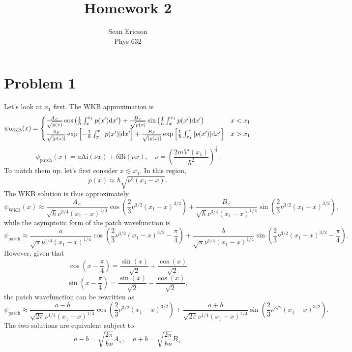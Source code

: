 \documentclass[12pt]{article}
\newcommand{\cint}[2]{\int_{#1}^{#2}}
\begin{document}
	
\title{Homework 2}
\author{Sean Ericson \\ Phys 632}
\maketitle

\section*{Problem 1}
Let's look at $x_1$ first. The WKB approximation is
\[ \psi_\text{WKB}(x) = \begin{cases}
    \frac{A_<}{\sqrt{p(x)}}\cos\left(\frac{1}{\hbar}\cint{x}{x_1}p(x')\dd x'\right) + \frac{B_<}{\sqrt{p(x)}}\sin\left(\frac{1}{\hbar}\cint{x}{x_1}p(x')\dd x'\right) & x < x_1 \\
    \frac{A_F}{\sqrt{\abs{p(x)}}}\exp\left[-\frac{1}{\hbar}\cint{x_1}{x}\abs{p(x')}\dd x'\right] + \frac{B_F}{\sqrt{\abs{p(x)}}}\exp\left[\frac{1}{\hbar}\cint{x_1}{x}\abs{p(x')}\dd x'\right] & x > x_1
\end{cases} \]
\[ \psi_\text{patch}(x) = a\text{Ai}(\nu x) + b\text{Bi}(\nu x), \quad \nu = \left(\frac{2mV'(x_1)}{\hbar^2}\right)^{\frac{1}{3}}. \]
To match them up, let's first consider $x \lesssim x_1$. In this region,
\[ p(x) \approx \hbar\sqrt{\nu^3(x_1-x)}. \]
The WKB solution is thus approximately
\[ \psi_\text{WKB}(x) \approx \frac{A_<}{\sqrt{\hbar}\nu^{3/4}(x_1-x)^{1/4}}\cos\left(\frac{2}{3}\nu^{3/2}(x_1-x)^{3/2}\right) + \frac{B_<}{\sqrt{\hbar}\nu^{3/4}(x_1-x)^{1/4}}\sin\left(\frac{2}{3}\nu^{3/2}(x_1-x)^{3/2}\right), \]
while the asymptotic form of the patch wavefunction is
\[ \psi_\text{patch} \approx \frac{a}{\sqrt{\pi}\nu^{1/4}(x_1-x)^{1/4}}\cos\left(\frac{2}{3}\nu^{3/2}(x_1-x)^{3/2}-\frac{\pi}{4}\right) + \frac{b}{\sqrt{\pi}\nu^{1/4}(x_1-x)^{1/4}}\sin\left(\frac{2}{3}\nu^{3/2}(x_1-x)^{3/2}-\frac{\pi}{4}\right). \]
However, given that
\[ \cos\left(x - \frac{\pi}{4}\right) = \frac{\sin(x)}{\sqrt{2}} + \frac{\cos(x)}{\sqrt{2}} \]
\[ \sin\left(x - \frac{\pi}{4}\right) = \frac{\sin(x)}{\sqrt{2}} - \frac{\cos(x)}{\sqrt{2}}, \]
the patch wavefunction can be rewritten as
\[ \psi_\text{patch} \approx \frac{a-b}{\sqrt{2\pi}\nu^{1/4}(x_1-x)^{1/4}}\cos\left(\frac{2}{3}\nu^{3/2}(x_1-x)^{3/2}\right) + \frac{a+b}{\sqrt{2\pi}\nu^{1/4}(x_1-x)^{1/4}}\sin\left(\frac{2}{3}\nu^{3/2}(x_1-x)^{3/2}\right). \]
The two solutions are equivalent subject to
\[ a - b = \sqrt{\frac{2\pi}{\hbar\nu}}A_<, \quad a + b = \sqrt{\frac{2\pi}{\hbar\nu}} B_< \tag{1}\]
\end{document}
